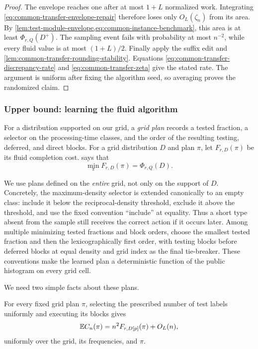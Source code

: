 \begin{proof}
The envelope reaches one after at most $1+L$ normalized work.  Integrating
\cref{eq:common-transfer-envelope-repair} therefore loses only
$O_L(\zeta_n)$ from its area.  By
\cref{lem:test-module-envelope,eq:common-instance-benchmark}, this area is at
least $\Phi_{r,Q}(D^+)$.  The sampling event fails with probability at most
$n^{-2}$, while every fluid value is at most $(1+L)/2$.  Finally apply the
suffix edit and \cref{lem:common-transfer-rounding-stability}.  Equations
\eqref{eq:common-transfer-discrepancy-rate} and
\eqref{eq:common-transfer-zeta} give the stated rate.  The argument is
uniform after fixing the algorithm seed, so averaging proves the randomized
claim.
\end{proof}

\subsubsection{Upper bound: learning the fluid algorithm}
\label{sec:common-learning-transfer}

For a distribution supported on our grid, a \emph{grid plan} records a
tested fraction, a selector on the processing-time classes, and the order of
the resulting testing, deferred, and direct blocks.  For a grid distribution
$D$ and plan $\pi$, let $F_{r,D}(\pi)$ be its fluid completion cost.
 says that
\begin{equation}
 \min_\pi F_{r,D}(\pi)=\Phi_{r,Q}(D).
 \label{eq:common-template-optimum}
\end{equation}

We use plans defined on the \emph{entire} grid, not only on the support of
$D$.  Concretely, the maximum-density selector is extended canonically to an
empty class: include it below the reciprocal-density threshold, exclude it
above the threshold, and use the fixed convention ``include'' at equality.
Thus a short type absent from the sample still receives the correct action if
it occurs later.  Among multiple minimizing tested fractions and block
orders, choose the smallest tested fraction and then the lexicographically
first order, with testing blocks before deferred blocks at equal density and
grid index as the final tie-breaker.  These conventions make the learned
plan a deterministic function of the public histogram on every grid cell.

We need two simple facts about these plans.

\begin{claim}
\label{clm:common-finite-template-kernel}
For every fixed grid plan $\pi$, selecting the prescribed number of test
labels uniformly and executing its blocks gives
\begin{equation}
 \mathbb{E} C_n(\pi)=n^2F_{r,D[p]}(\pi)+O_L(n),
 \label{eq:common-finite-template-kernel}
\end{equation}
uniformly over the grid, its frequencies, and $\pi$.
\end{claim}

